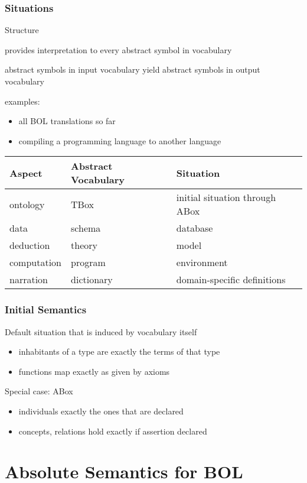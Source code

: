 \begin{frame}\frametitle{Situations}
\begin{blockitems}{Structure}
\item provides interpretation to every abstract symbol in vocabulary
\item abstract symbols in input vocabulary yield abstract symbols in output vocabulary
\item examples:
 \begin{itemize}
 \item all BOL translations so far
 \item compiling a programming language to another language
 \end{itemize}
\end{blockitems}

\begin{center}
\begin{tabular}{l|ll}
Aspect & Abstract Vocabulary & Situation \\
\hline
ontology & TBox & initial situation through ABox \\
data & schema & database \\
deduction & theory & model \\
computation & program & environment \\
narration & dictionary & domain-specific definitions \\
\end{tabular}
\end{center}
\end{frame}

\begin{frame}\frametitle{Initial Semantics}
Default situation that is induced by vocabulary itself
\begin{itemize}
\item inhabitants of a type are exactly the terms of that type
\item functions map exactly as given by axioms
\end{itemize}

Special case: ABox
\begin{itemize}
\item individuals exactly the ones that are declared
\item concepts, relations hold exactly if assertion declared
\end{itemize}
\end{frame}

\section{Absolute Semantics for BOL}

